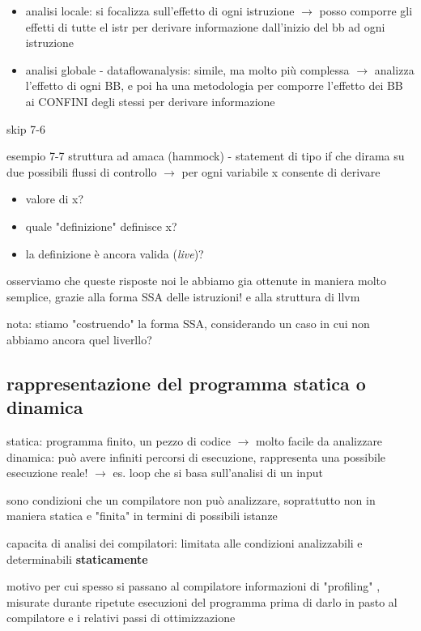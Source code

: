 \begin{itemize}
  \item analisi locale: si focalizza sull'effetto di ogni istruzione $\rightarrow$ posso comporre gli effetti di tutte el istr per derivare informazione dall'inizio del bb ad ogni istruzione
  \item analisi globale - dataflowanalysis: simile, ma molto pi\`u complessa $\rightarrow$ analizza l'effetto di ogni BB, e poi ha una metodologia per comporre l'effetto dei BB ai CONFINI degli stessi per derivare informazione
\end{itemize}

skip 7-6

esempio 7-7 struttura ad amaca (hammock) - statement di tipo if che dirama su due possibili flussi di controllo $\rightarrow$ per ogni variabile x consente di derivare
\begin{itemize}
  \item valore di x?
  \item quale "definizione" definisce x?
  \item la definizione \`e ancora valida (\textit{live})?
\end{itemize}

osserviamo che queste risposte noi le abbiamo gia ottenute in maniera molto semplice, grazie alla forma SSA delle istruzioni! e alla struttura di llvm

nota: stiamo "costruendo" la forma SSA, considerando un caso in cui non abbiamo ancora quel liverllo?

\subsection{rappresentazione del programma statica o dinamica}

statica: programma finito, un pezzo di codice $\rightarrow$ molto facile da analizzare
dinamica: pu\`o avere infiniti percorsi di esecuzione, rappresenta una possibile esecuzione reale! $\rightarrow$ es. loop che si basa sull'analisi di un input

sono condizioni che un compilatore non pu\`o analizzare, soprattutto non in maniera statica e "finita" in termini di possibili istanze

\begin{emphasize}
    capacita di analisi dei compilatori: limitata alle condizioni analizzabili e determinabili \textbf{staticamente}

    motivo per cui spesso si passano al compilatore informazioni di "profiling" , misurate durante ripetute esecuzioni del programma prima di darlo in pasto al compilatore e i relativi passi di ottimizzazione
\end{emphasize}

